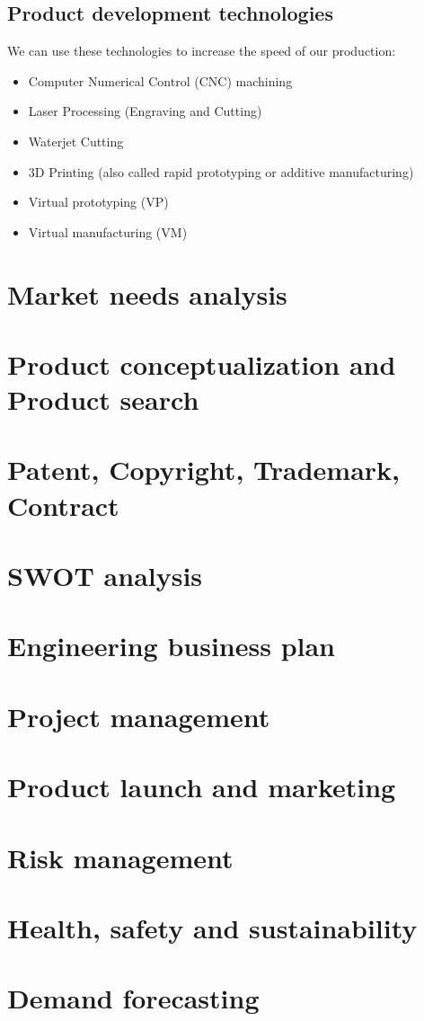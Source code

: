 \documentclass{article}
\begin{document}
\subsection{Product development technologies}
We can use these technologies to increase the speed of our production:
\begin{itemize}
    \item Computer Numerical Control (CNC) machining
    \item Laser Processing (Engraving and Cutting)
    \item Waterjet Cutting
    \item 3D Printing (also called rapid prototyping or additive manufacturing)
    \item Virtual prototyping (VP)
    \item Virtual manufacturing (VM)
\end{itemize}


\section{Market needs analysis}
\label{sec:market}
\section{Product conceptualization and Product search}
\section{Patent, Copyright, Trademark, Contract}
\section{SWOT analysis}
\section{Engineering business plan}
\section{Project management}
\section{Product launch and marketing}
\section{Risk management}
\section{Health, safety and sustainability}
\section{Demand forecasting}
\end{document}
